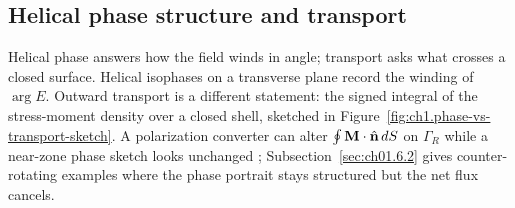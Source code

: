 \subsection{Helical phase structure and transport}
\label{sec:ch01.2.2}

Helical phase answers how the field winds in angle; transport asks what crosses a closed surface. Helical isophases on a transverse plane record the winding of $\arg E$. Outward transport is a different statement: the signed integral of the stress-moment density over a closed shell, sketched in Figure~\ref{fig:ch1.phase-vs-transport-sketch}. A polarization converter can alter $\oint \mathbf{M}\cdot\hat{\mathbf{n}}\,dS$ on $\Gamma_R$ while a near-zone phase sketch looks unchanged \cite{allen1992,beth1936}; Subsection~\ref{sec:ch01.6.2} gives counter-rotating examples where the phase portrait stays structured but the net flux cancels.

